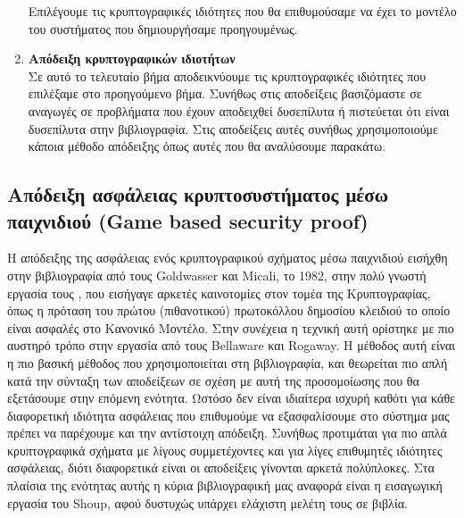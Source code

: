 \begin{enumerate}
    Επιλέγουμε τις κρυπτογραφικές ιδιότητες που θα επιθυμούσαμε να έχει το μοντέλο του συστήματος που δημιουργήσαμε προηγουμένως. 
    \item \textbf{Απόδειξη κρυπτογραφικών ιδιοτήτων}\\
    Σε αυτό το τελευταίο βήμα αποδεικνύουμε τις κρυπτογραφικές ιδιότητες που επιλέξαμε στο προηγούμενο βήμα. Συνήθως στις αποδείξεις βασιζόμαστε σε αναγωγές σε προβλήματα που έχουν αποδειχθεί δυσεπίλυτα ή πιστεύεται ότι είναι δυσεπίλυτα στην βιβλιογραφία. Στις αποδείξεις αυτές συνήθως χρησιμοποιούμε κάποια μέθοδο απόδειξης όπως αυτές που θα αναλύσουμε παρακάτω.
\end{enumerate}

\subsection{Απόδειξη ασφάλειας κρυπτοσυστήματος μέσω παιχνιδιού (Game based security proof)}

H απόδειξης της ασφάλειας ενός κρυπτογραφικού σχήματος μέσω παιχνιδιού εισήχθη στην βιβλιογραφία από τους Goldwasser και Micali, το 1982, στην πολύ γνωστή εργασία τους \cite{10.1145/800070.802212}, που εισήγαγε αρκετές καινοτομίες στον τομέα της Κρυπτογραφίας, όπως η πρόταση του πρώτου (πιθανοτικού) πρωτοκόλλου δημοσίου κλειδιού το οποίο είναι ασφαλές στο Κανονικό Μοντέλο. Στην συνέχεια η τεχνική αυτή ορίστηκε με πιο αυστηρό τρόπο στην εργασία \cite{bellare2004game} από τους Bellaware και Rogaway. Η μέθοδος αυτή είναι η πιο βασική μέθοδος που χρησιμοποιείται στη βιβλιογραφία, και θεωρείται πιο απλή κατά την σύνταξη των αποδείξεων σε σχέση με αυτή της προσομοίωσης που θα εξετάσουμε στην επόμενη ενότητα. Ωστόσο δεν είναι ιδιαίτερα ισχυρή καθότι για κάθε διαφορετική ιδιότητα ασφάλειας που επιθυμούμε να εξασφαλίσουμε στο σύστημα μας πρέπει να παρέχουμε και την αντίστοιχη απόδειξη. Συνήθως προτιμάται για πιο απλά κρυπτογραφικά σχήματα με λίγους συμμετέχοντες και για λίγες επιθυμητές ιδιότητες ασφάλειας, διότι διαφορετικά είναι οι αποδείξεις γίνονται αρκετά πολύπλοκες. Στα πλαίσια της ενότητας αυτής η κύρια βιβλιογραφική μας αναφορά είναι η εισαγωγική εργασία \cite{cryptoeprint:2004/332} του Shoup, αφού δυστυχώς υπάρχει ελάχιστη μελέτη τους σε βιβλία.

